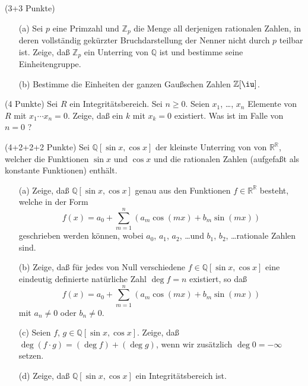\documentclass{algsheet}
\begin{document}
\begin{exercise}(3+3 Punkte)\vspace{-1ex}
  \begin{itemize}
   \item [(a)] Sei \(p\) eine Primzahl und \(\mathbb Z_p\) die Menge all derjenigen rationalen
    Zahlen, in deren vollständig gekürzter Bruchdarstellung der Nenner nicht durch
    \(p\) teilbar ist.
    Zeige, daß \(\mathbb Z_p\) ein Unterring von \(\mathbb Q\) ist und bestimme seine
    Einheitengruppe.
   \item [(b)]     Bestimme die Einheiten der ganzen Gaußschen Zahlen \(\mathbb Z[\iu]\).
  \end{itemize}
\end{exercise}



\begin{exercise}(4 Punkte)\newline
    Sei \(R\) ein Integritätsbereich. Sei \(n \ge 0\).
    Seien \(x_1\), \dots, \(x_n\) Elemente
    von \(R\) mit \(x_1 \dotsm x_n = 0\). Zeige, daß ein \(k\) mit \(x_k = 0\)
    existiert. Was ist im Falle von $n=0$ ?
\end{exercise}




\begin{exercise}(4+2+2+2 Punkte)\newline
    Sei \(\mathbb Q[\sin x, \cos x]\) der kleinste Unterring von
    von \(\mathbb R^{\mathbb R}\), welcher die Funktionen \(\sin x\) und \(\cos x\) 
    und die rationalen Zahlen (aufgefaßt als konstante Funktionen)
    enthält.
\vspace{-1ex}
    \begin{itemize}
  \item [(a)] 
    Zeige, daß \(\mathbb Q[\sin x, \cos x]\) genau aus den Funktionen
    \(f \in \mathbb R^{\mathbb R}\) besteht, welche in der Form
    \begin{equation}
        f(x) = a_0 + \sum_{m = 1}^n (a_m \cos (m x) + b_m \sin (m x))
    \end{equation}
    geschrieben werden können, wobei \(a_0\), \(a_1\), \(a_2\), \dots und
    \(b_1\), \(b_2\), \dots rationale Zahlen sind.
  \item [(b)] 
    Zeige, daß für jedes von Null verschiedene \(f \in \mathbb Q[\sin x, \cos x]\)
    eine eindeutig definierte natürliche Zahl \(\deg f = n\) existiert, so daß
    \begin{equation}
        f(x) = a_0 + \sum_{m = 1}^n (a_m \cos (m x) + b_m \sin (m x))
    \end{equation}
    mit \(a_n \neq 0\) oder \(b_n \neq 0\).
  \item [(c)] 
    Seien \(f\), \(g \in \mathbb Q[\sin x, \cos x]\). Zeige, daß \(\deg (f \cdot g)
    = (\deg f) + (\deg g)\), wenn wir zusätzlich \(\deg 0 = -\infty\) setzen.
  \item[(d)] 
    Zeige, daß \(\mathbb Q[\sin x, \cos x]\) ein Integritätsbereich ist. 
\end{itemize}
\end{exercise}
\end{document}
